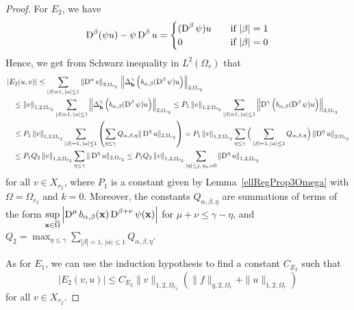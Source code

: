 \begin{proof}
For $E_2$, we have
\[
\operatorname{D}^\beta( \psi u) - \psi \operatorname{D}^\beta u =
\begin{cases}
(\operatorname{D}^\beta \psi ) u  & \quad \text{if} \ |\beta|=1 \\
0 & \quad \text{if} \ |\beta| = 0
\end{cases}
\]
Hence, we get from Schwarz inequality in $\displaystyle L^2(\Omega_r)$ that
\begin{align*}
&\left| E_2(u,v) \right|
\leq \sum_{|\beta|= 1,\,|\alpha|\leq 1}
\left\| \operatorname{D}^\alpha v\right\|_{2,\Omega_{r_2}} \,
\left\| \Delta_{\mathbf{h}}^\gamma \left( b_{\alpha,\beta}
(\operatorname{D}^\beta \psi) u \right)\right\|_{2,\Omega_{r_2}} \\
&\quad \leq \left\|v\right\|_{1,2,\Omega_{r_2}}
\sum_{|\beta|= 1,\,|\alpha|\leq 1} \left\| 
\Delta_{\mathbf{h}}^\gamma \left( b_{\alpha,\beta} (\operatorname{D}^\beta \psi) u \right)
\right\|_{2,\Omega_{r_2}}
\leq P_1 \left\|v\right\|_{1,2,\Omega_{r_2}}
\sum_{|\beta|= 1,\,|\alpha|\leq 1} \left\| 
\operatorname{D}^\gamma \left( b_{\alpha,\beta} (\operatorname{D}^\beta \psi) u \right)
\right\|_{2,\Omega_{r_2}} \\
&\quad \leq P_1 \left\|v\right\|_{1,2,\Omega_{r_2}}
\sum_{|\beta|=1,\,|\alpha|\leq 1} \left(
\sum_{\eta \leq \gamma} Q_{\alpha,\beta,\eta}
\| \operatorname{D}^\eta u \|_{2,\Omega_{r_2}} \right)
= P_1 \left\|v\right\|_{1,2,\Omega_{r_2}}
\sum_{\eta \leq \gamma} \Big( \sum_{|\beta|=1,\,|\alpha|\leq 1}
 Q_{\alpha,\beta,\eta} \Big) \left\| \operatorname{D}^\eta u \right\|_{2,\Omega_{r_2}} \\
&\quad \leq P_1 Q_2 \left\|v\right\|_{1,2,\Omega_{r_2}} \sum_{\eta \leq \gamma}
\| \operatorname{D}^\eta u \|_{2,\Omega_{r_2}}
\leq P_1 Q_2 \left\|v\right\|_{1,2,\Omega_{r_2}} \sum_{|\eta|\leq j,\,\eta_n=0}
\left\| \operatorname{D}^\eta u \right\|_{1,2,\Omega_{r_2}}
\end{align*}
for all $v \in X_{r_2}$, where $P_1$ is a constant given by
Lemma~\ref{ellRegProp3Omega} with $\Omega = \Omega_{r_2}$ and $k=0$.
Moreover, the constants $Q_{\alpha,\beta,\eta}$ are summations of
terms of the form
$\displaystyle \sup_{\mathbf{x} \in \overline{\Omega}} \left|\operatorname{D}^{\mu}
b_{\alpha,\beta}(\mathbf{x})\operatorname{D}^{\beta+\nu} \psi(\mathbf{x}) \right|$
for $\mu+\nu \leq \gamma - \eta$, and
$\displaystyle Q_2 = \max_{\eta \leq \gamma} \sum_{|\beta|=1,\,|\alpha|\leq 1}
Q_{\alpha,\beta,\eta}$.

As for $E_1$, we can use the induction
hypothesis to find a constant $C_{E_2}$ such that
\[
\left| E_2(v,u) \right| \leq C_{E_2} \|v\|_{1,2,\Omega_{r_2}}
\left( \|f\|_{q,2,\Omega_r} + \|u\|_{1,2,\Omega_r} \right)
\]
for all $v \in X_{r_2}$.


\end{proof}
